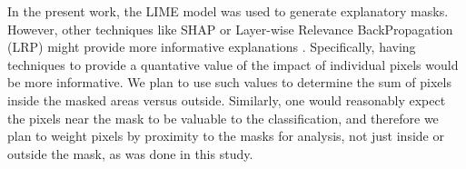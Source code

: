 \documentclass[sn-mathphys,Numbered]{sn-jnl}%
\theoremstyle{thmstyleone}%
\theoremstyle{thmstyletwo}%
\theoremstyle{thmstylethree}%
\begin{document}
In the present work, the LIME model was used to generate explanatory masks.  However, other techniques like SHAP or Layer-wise Relevance BackPropagation (LRP) might provide more informative explanations \cite{SALEEM2022165}.  Specifically, having techniques to provide a quantative value of the impact of individual pixels would be more informative.  We plan to use such values to determine the sum of pixels inside the masked areas versus outside.  Similarly, one would reasonably expect the pixels near the mask to be valuable to the classification, and therefore we plan to weight pixels by proximity to the masks for analysis, not just inside or outside the mask, as was done in this study.










\end{document}
